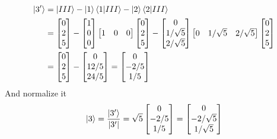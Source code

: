 \documentclass[../../../main.tex]{subfiles}
\begin{document}
\begin{align*}
	\ket{3'} & =\ket{III}-\ket{1}\braket{1|III}-\ket{2}\braket{2|III} \\
	         & =\begin{bmatrix}
		            0 \\2\\5
	            \end{bmatrix}-\begin{bmatrix}
		                          1 \\0\\0
	                          \end{bmatrix}
	\begin{bmatrix}
		1 & 0 & 0
	\end{bmatrix}
	\begin{bmatrix}
		0 \\2\\5
	\end{bmatrix}
	-
	\begin{bmatrix}
		0 \\1/\sqrt{5}\\2/\sqrt{5}
	\end{bmatrix}
	\begin{bmatrix}
		0 & 1/\sqrt{5} & 2/\sqrt{5}
	\end{bmatrix}
	\begin{bmatrix}
		0 \\2\\5
	\end{bmatrix}                                                    \\
	         & =\begin{bmatrix}
		            0 \\2\\5
	            \end{bmatrix}
	-
	\begin{bmatrix}
		0 \\12/5\\24/5
	\end{bmatrix}
	=
	\begin{bmatrix}
		0 \\-2/5\\1/5
	\end{bmatrix}
\end{align*}
And normalize it
\begin{equation*}
	\ket{3}=\frac{\ket{3'}}{|3'|}=\sqrt{5}\begin{bmatrix}
		0 \\-2/5\\1/5
	\end{bmatrix}
	=
	\begin{bmatrix}
		0 \\-2/\sqrt{5}\\1/\sqrt{5}
	\end{bmatrix}
\end{equation*}
\end{document}
